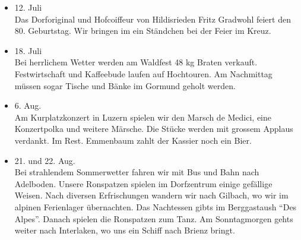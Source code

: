 \begin{multicols}{2}
\begin{itemize}
        \item[]12. Juli\\
        Das Dorforiginal und Hofcoiffeur von Hildisrieden Fritz Gradwohl feiert den 80. Geburtstag.
        Wir bringen im ein Ständchen bei der Feier im Kreuz.

        \item[]18. Juli\\
        Bei herrlichem Wetter werden am Waldfest 48 kg Braten verkauft.
        Festwirtschaft und Kaffeebude laufen auf Hochtouren.
        Am Nachmittag müssen sogar Tische und Bänke im Gormund geholt werden.

        \item[]6. Aug.\\
        Am Kurplatzkonzert in Luzern spielen wir den Marsch de Medici, eine Konzertpolka und weitere Märsche.
        Die Stücke werden mit grossem Applaus verdankt. Im Rest. Emmenbaum zahlt der Kassier noch ein Bier.

        \item[]21. und 22. Aug.\\
        Bei strahlendem Sommerwetter fahren wir mit Bus und Bahn nach Adelboden.
        Unsere Ronspatzen spielen im Dorfzentrum einige gefällige Weisen.
        Nach diversen Erfrischungen wandern wir nach Gilbach, wo wir im alpinen Ferienlager übernachten.
        Das Nachtessen gibts im Berggastaush "`Des Alpes"'. Danach spielen die Ronspatzen zum Tanz.
        Am Sonntagmorgen gehts weiter nach Interlaken, wo uns ein Schiff nach Brienz bringt.


    \end{itemize}

\end{multicols}
